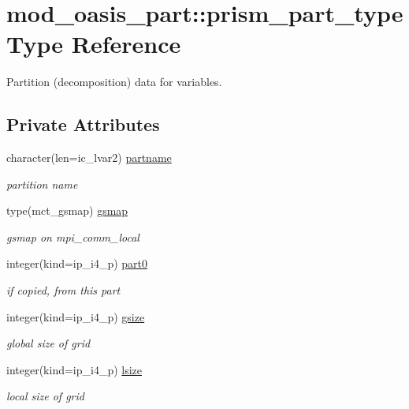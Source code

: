 \hypertarget{structmod__oasis__part_1_1prism__part__type}{}\section{mod\+\_\+oasis\+\_\+part\+:\+:prism\+\_\+part\+\_\+type Type Reference}
\label{structmod__oasis__part_1_1prism__part__type}


Partition (decomposition) data for variables.  


\subsection*{Private Attributes}
\begin{DoxyCompactItemize}
\item 
character(len=ic\+\_\+lvar2) \hyperlink{structmod__oasis__part_1_1prism__part__type_ae53180c23d73bf1f4930e24171dba0a2}{partname}
\begin{DoxyCompactList}\small\item\em partition name \end{DoxyCompactList}\item 
type(mct\+\_\+gsmap) \hyperlink{structmod__oasis__part_1_1prism__part__type_a3d605216cf9bdf556416419ee8ec5993}{gsmap}
\begin{DoxyCompactList}\small\item\em gsmap on mpi\+\_\+comm\+\_\+local \end{DoxyCompactList}\item 
integer(kind=ip\+\_\+i4\+\_\+p) \hyperlink{structmod__oasis__part_1_1prism__part__type_a907a511655abcbb184be5bba51ea1edb}{part0}
\begin{DoxyCompactList}\small\item\em if copied, from this part \end{DoxyCompactList}\item 
integer(kind=ip\+\_\+i4\+\_\+p) \hyperlink{structmod__oasis__part_1_1prism__part__type_aaa2c19e53815eaf5df431612eadabfa4}{gsize}
\begin{DoxyCompactList}\small\item\em global size of grid \end{DoxyCompactList}\item 
integer(kind=ip\+\_\+i4\+\_\+p) \hyperlink{structmod__oasis__part_1_1prism__part__type_a7d857ca94b6eef3642bb6fd1ffeff551}{lsize}
\begin{DoxyCompactList}\small\item\em local size of grid \end{DoxyCompactList}\item 

\end{DoxyCompactItemize}
